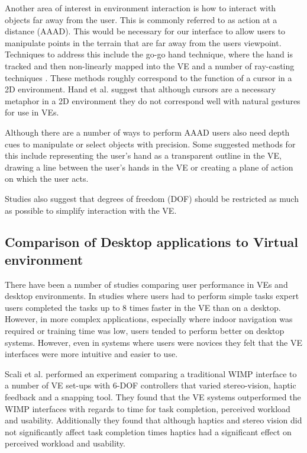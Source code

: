 \documentclass{sig-alternate-05-2015}
\begin{document}
 Another area of interest in environment interaction is how to interact with objects far away from the user. This is commonly referred to as action at a distance (AAAD). This would be necessary for our interface to allow users to manipulate points in the terrain that are far away from the users viewpoint. Techniques to address this include the go-go hand technique\cite{Poupyrev1996}, where the hand is tracked and then non-linearly mapped into the VE and a number of ray-casting techniques \cite{Bowman2001}. These methods roughly correspond to the function of a cursor in a 2D environment. Hand et al.\cite{Hand1997} suggest that although cursors are a necessary metaphor in a 2D environment they do not correspond well with natural gestures for use in VEs.
 
 Although there are a number of ways to perform AAAD users also need depth cues to manipulate or select objects with precision.\cite{Schultheis2012} Some suggested methods for this include representing the user's hand as a transparent outline in the VE\cite{Hinckley1994}, drawing a line between the user's hands in the VE\cite{Schultheis2012} or creating a plane of action\cite{Mine2014} on which the user acts.
 
 
 Studies also suggest that degrees of freedom (DOF) should be restricted as much as possible to simplify interaction with the VE.\cite{Bowman2001}

\subsection{Comparison of Desktop applications to Virtual environment}
There have been a number of studies comparing user performance in VEs and desktop environments. In studies where users had to perform simple tasks expert users completed the tasks up to 8 times faster in the VE than on a desktop.\cite{Schultheis2012} However, in more complex applications, especially where indoor navigation was required or training time was low, users tended to perform better on desktop systems\cite{SousaSantos2009}. However, even in systems where users were novices they felt that the VE interfaces were more intuitive and easier to use\cite{Toma2012}.

 Scali et al. performed an experiment comparing a traditional WIMP interface to a number of VE set-ups with 6-DOF controllers that varied stereo-vision, haptic feedback and a snapping tool\cite{Scali2003}. They found that the VE systems outperformed the WIMP interfaces with regards to time for task completion, perceived workload and usability. Additionally they found that although haptics and stereo vision did not significantly affect task completion times haptics had a significant effect on perceived workload and usability.
 
\end{document}
